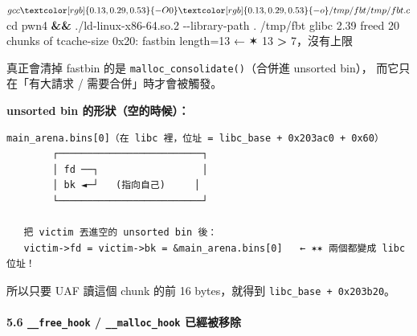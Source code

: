 \documentclass[10pt,a4paper]{article}
\newenvironment{Shaded}{\begin{snugshade}}{\end{snugshade}}
\newcommand{\AttributeTok}[1]{\textcolor[rgb]{0.13,0.29,0.53}{#1}}
\newcommand{\ExtensionTok}[1]{#1}
\newcommand{\KeywordTok}[1]{\textcolor[rgb]{0.13,0.29,0.53}{\textbf{#1}}}
\newcommand{\NormalTok}[1]{#1}
\newcommand{\OperatorTok}[1]{\textcolor[rgb]{0.81,0.36,0.00}{\textbf{#1}}}
\renewenvironment{Shaded}{%
  \def\FrameCommand{\fboxsep=3.2pt\colorbox{shadecolor}}%
  \MakeFramed{\advance\hsize-\width\FrameRestore\small}%
}{%
  \endMakeFramed
}
\begin{document}
\begin{Shaded}
\begin{Highlighting}[]
\ExtensionTok{$}\NormalTok{ gcc }\AttributeTok{{-}O0} \AttributeTok{{-}o}\NormalTok{ /tmp/fbt /tmp/fbt.c}
\ExtensionTok{$}\NormalTok{ cd pwn4 }\KeywordTok{\&\&} \ExtensionTok{./ld{-}linux{-}x86{-}64.so.2} \AttributeTok{{-}{-}library{-}path}\NormalTok{ . /tmp/fbt}
\ExtensionTok{glibc}\NormalTok{ 2.39}
\ExtensionTok{freed}\NormalTok{ 20 chunks of tcache{-}size 0x20: fastbin length=13    ← ✶ 13 }\OperatorTok{\textgreater{}}\NormalTok{ 7，沒有上限}
\end{Highlighting}
\end{Shaded}

真正會清掉 fastbin 的是 \texttt{malloc\_\allowbreak{}consolidate()}（合併進 unsorted
bin）， 而它只在「有大請求 / 需要合併」時才會被觸發。

\textbf{unsorted bin 的形狀（空的時候）：}

\begin{Verbatim}[breaklines=true,breakanywhere=true,breakautoindent=false,fontsize=\fontsize{7.0}{9.5}\selectfont]
   main_arena.bins[0]（在 libc 裡，位址 = libc_base + 0x203ac0 + 0x60）
        ┌─────────────────────────┐
        │ fd ──┐                  │
        │ bk ◄─┘   (指向自己)     │
        └─────────────────────────┘

   把 victim 丟進空的 unsorted bin 後：
   victim->fd = victim->bk = &main_arena.bins[0]   ← ✶✶ 兩個都變成 libc 位址！
\end{Verbatim}

所以只要 UAF 讀這個 chunk 的前 16 bytes，就得到
\texttt{libc\_\allowbreak{}base\ \allowbreak{}+\ \allowbreak{}0x203b20}。

\paragraph{\texorpdfstring{5.6 \texttt{\_\allowbreak{}\_\allowbreak{}free\_\allowbreak{}hook} /
\texttt{\_\allowbreak{}\_\allowbreak{}malloc\_\allowbreak{}hook}
已經被移除}{5.6 \_\_free\_hook / \_\_malloc\_hook 已經被移除}}\label{free_hook-__malloc_hook-ux5df2ux7d93ux88abux79fbux9664}
\end{document}
